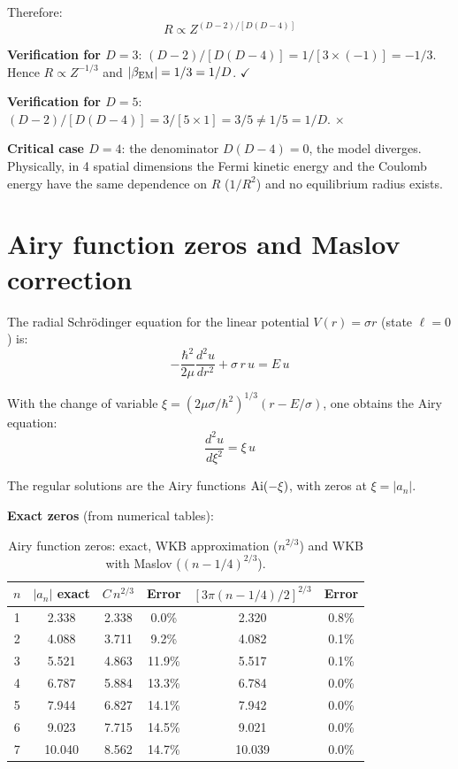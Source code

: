 \documentclass[10pt,a4paper]{article}
\begin{document}
Therefore:
\begin{equation}
R \propto Z^{(D-2)/[D(D-4)]}
\end{equation}

\textbf{Verification for $D = 3$}: $(D-2)/[D(D-4)] = 1/[3\times(-1)] = -1/3$. Hence $R \propto Z^{-1/3}$ and $|\beta_{\rm EM}| = 1/3 = 1/D$. $\checkmark$

\textbf{Verification for $D = 5$}: $(D-2)/[D(D-4)] = 3/[5\times 1] = 3/5 \neq 1/5 = 1/D$. $\times$

\textbf{Critical case $D = 4$}: the denominator $D(D-4) = 0$, the model diverges. Physically, in 4 spatial dimensions the Fermi kinetic energy and the Coulomb energy have the same dependence on $R$ ($1/R^2$) and no equilibrium radius exists.


\section{Airy function zeros and Maslov correction}\label{app:airy}

The radial Schr\"odinger equation for the linear potential $V(r) = \sigma r$ (state $\ell = 0$) is:
\begin{equation}
-\frac{\hbar^2}{2\mu}\frac{d^2u}{dr^2} + \sigma\,r\,u = E\,u
\end{equation}

With the change of variable $\xi = (2\mu\sigma/\hbar^2)^{1/3}(r - E/\sigma)$, one obtains the Airy equation:
\begin{equation}
\frac{d^2u}{d\xi^2} = \xi\,u
\end{equation}

The regular solutions are the Airy functions ${\rm Ai}(-\xi)$, with zeros at $\xi = |a_n|$.

\textbf{Exact zeros} (from numerical tables):

\begin{table}[h]
\centering
\caption{Airy function zeros: exact, WKB approximation ($n^{2/3}$) and WKB with Maslov ($(n-1/4)^{2/3}$).}\label{tab:airy}
\begin{tabular}{cccccc}
\toprule
$n$ & $|a_n|$ exact & $C\,n^{2/3}$ & Error & $[3\pi(n-1/4)/2]^{2/3}$ & Error \\
\midrule
1 & 2.338 & 2.338 & 0.0\% & 2.320 & 0.8\% \\
2 & 4.088 & 3.711 & 9.2\% & 4.082 & 0.1\% \\
3 & 5.521 & 4.863 & 11.9\% & 5.517 & 0.1\% \\
4 & 6.787 & 5.884 & 13.3\% & 6.784 & 0.0\% \\
5 & 7.944 & 6.827 & 14.1\% & 7.942 & 0.0\% \\
6 & 9.023 & 7.715 & 14.5\% & 9.021 & 0.0\% \\
7 & 10.040 & 8.562 & 14.7\% & 10.039 & 0.0\% \\
\bottomrule
\end{tabular}
\end{table}
\end{document}
